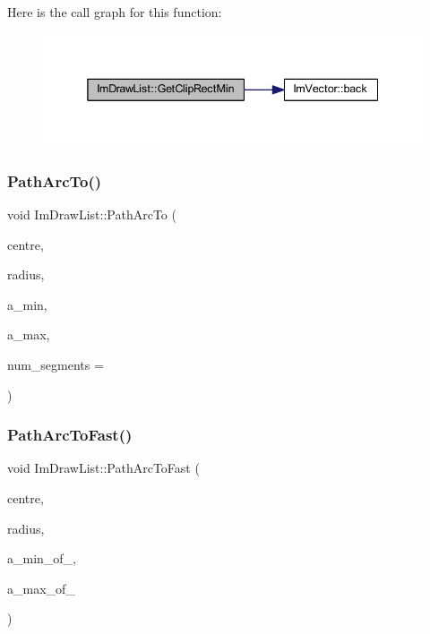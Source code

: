 Here is the call graph for this function\+:
\nopagebreak
\begin{figure}[H]
\begin{center}
\leavevmode
\includegraphics[width=338pt]{struct_im_draw_list_a9d83896d3eb434a9e1072d56523a2754_cgraph}
\end{center}
\end{figure}
\mbox{\label{struct_im_draw_list_acb69ef7febcc54c9e5e09d2460c85b61}} 
\subsubsection{\texorpdfstring{Path\+Arc\+To()}{PathArcTo()}}
{\footnotesize\ttfamily void Im\+Draw\+List\+::\+Path\+Arc\+To (\begin{DoxyParamCaption}\item[{const \mbox{\hyperlink{struct_im_vec2}{Im\+Vec2}} \&}]{centre,  }\item[{float}]{radius,  }\item[{float}]{a\+\_\+min,  }\item[{float}]{a\+\_\+max,  }\item[{int}]{num\+\_\+segments = {} }\end{DoxyParamCaption})}

\mbox{\label{struct_im_draw_list_a713cca3862e88aa1ee671db1c4cf6bdb}} 
\subsubsection{\texorpdfstring{Path\+Arc\+To\+Fast()}{PathArcToFast()}}
{\footnotesize\ttfamily void Im\+Draw\+List\+::\+Path\+Arc\+To\+Fast (\begin{DoxyParamCaption}\item[{const \mbox{\hyperlink{struct_im_vec2}{Im\+Vec2}} \&}]{centre,  }\item[{float}]{radius,  }\item[{int}]{a\+\_\+min\+\_\+of\+\_,  }\item[{int}]{a\+\_\+max\+\_\+of\+\_ }\end{DoxyParamCaption})}

